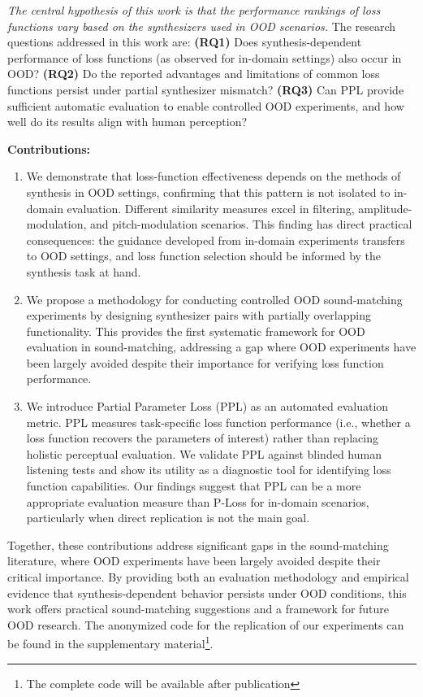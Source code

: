 \documentclass{article}
\begin{document}
 \textit{The central hypothesis of this work is that the performance rankings of loss functions vary based on the synthesizers used in OOD scenarios.} The research questions addressed in this work are: \textbf{(RQ1)} Does synthesis-dependent performance of loss functions (as observed for in-domain settings) also occur in OOD? \textbf{(RQ2)} Do the reported advantages and limitations of common loss functions persist under partial synthesizer mismatch? \textbf{(RQ3)} Can PPL provide sufficient automatic evaluation to enable controlled OOD experiments, and how well do its results align with human perception?


\textbf{Contributions:} 
\begin{enumerate}
    \item We demonstrate that loss-function effectiveness depends on the methods of synthesis in OOD settings, confirming that this pattern is not isolated to in-domain evaluation. Different similarity measures excel in filtering, amplitude-modulation, and pitch-modulation scenarios. This finding has direct practical consequences: the guidance developed from in-domain experiments transfers to OOD settings, and loss function selection should be informed by the synthesis task at hand.

    \item  We propose a methodology for conducting controlled OOD sound-matching experiments by designing synthesizer pairs with partially overlapping functionality. This provides the first systematic framework for OOD evaluation in sound-matching, addressing a gap where OOD experiments have been largely avoided despite their importance for verifying loss function performance.
    
    \item We introduce Partial Parameter Loss (PPL) as an automated evaluation metric. PPL measures task-specific loss function performance (i.e., whether a loss function recovers the parameters of interest) rather than replacing holistic perceptual evaluation. We validate PPL against blinded human listening tests and show its utility as a diagnostic tool for identifying loss function capabilities. Our findings suggest that PPL can be a more appropriate evaluation measure than P-Loss for in-domain scenarios, particularly when direct replication is not the main goal. 
\end{enumerate}

Together, these contributions address significant gaps in the sound-matching literature, where OOD experiments have been largely avoided despite their critical importance. By providing both an evaluation methodology and empirical evidence that synthesis-dependent behavior persists under OOD conditions, this work offers practical sound-matching suggestions and a framework for future OOD research. The anonymized code for the replication of our experiments can be found in the supplementary material\footnote{The complete code will be available after publication}.
\end{document}
